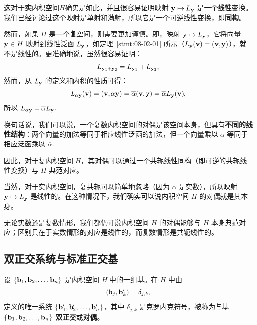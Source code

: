 这对于\textbf{实}内积空间$H$确实是如此，并且很容易证明映射 $\mathbf{y} \mapsto L_{\mathbf{y}}$ 是一个\textbf{线性}变换。我们已经讨论过这个映射是单射和满射，所以它是一个可逆线性变换，即\textbf{同构}。

然而，如果 $H$ 是一个\textbf{复}空间，则需要更加谨慎。即，映射 $\mathbf{y} \mapsto L_{\mathbf{y}}$，它将向量 $\mathbf{y} \in H$ 映射到线性泛函 $L_{\mathbf{y}}$，如定理~\ref{stmt:08-02-01} 所示（$L_{\mathbf{y}}(\mathbf{v}) = (\mathbf{v}, \mathbf{y})$），就不是线性的。更准确地说，虽然很容易证明：
\begin{equation}\label{eq:08-02-03}
L_{\mathbf{y}_1+\mathbf{y}_2} = L_{\mathbf{y}_1} + L_{\mathbf{y}_2},
\end{equation}
然而，从 $L_{\mathbf{y}}$ 的定义和内积的性质可得：
\begin{equation}\label{eq:08-02-04}
L_{\alpha \mathbf{y}}(\mathbf{v}) = (\mathbf{v}, \alpha \mathbf{y}) = \overline{\alpha} (\mathbf{v}, \mathbf{y}) = \overline{\alpha} L_{\mathbf{y}}(\mathbf{v}) ,
\end{equation}
所以 $L_{\alpha \mathbf{y}} = \overline{\alpha} L_{\mathbf{y}}$.~

换句话说，我们可以说，一个复数内积空间的对偶是该空间本身，但具有\textbf{不同的线性结构}：两个向量的加法等同于相应线性泛函的加法，但一个向量乘以 $\alpha$ 等同于相应泛函乘以 $\overline{\alpha}$.~



因此，对于复内积空间 $H$，其对偶可以通过一个共轭线性同构（即可逆的共轭线性变换）与 $H$ 典范对应。

当然，对于实内积空间，复共轭可以简单地忽略（因为 $\alpha$ 是实数），所以映射 $\mathbf{y} \mapsto L_{\mathbf{y}}$ 是线性的。在这种情况下，我们确实可以说内积空间 $H$ 的对偶就是其本身。

无论实数还是复数情形，我们都仍可说内积空间 $H$ 的对偶能够与 $H$ 本身典范对应；区别只在于实数情形的对应是线性的，而复数情形是共轭线性的。

\subsection{双正交系统与标准正交基}\label{sec:08-02-03}

\begin{definition}\label{stmt:08-02-02}
设 $\{\mathbf{b}_1, \mathbf{b}_2, \dots, \mathbf{b}_n\}$ 是内积空间 $H$ 中的一组基。在 $H$ 中由
$$(\mathbf{b}_j, \mathbf{b}'_k) = \delta_{j,k},$$
定义的唯一系统 $\{\mathbf{b}'_1, \mathbf{b}'_2, \dots, \mathbf{b}'_n\}$，其中 $\delta_{j,k}$ 是克罗内克符号，被称为与基 $\{\mathbf{b}_1, \mathbf{b}_2, \dots, \mathbf{b}_n\}$ \textbf{双正交}或\textbf{对偶}。
\end{definition}

